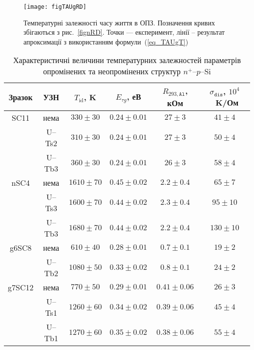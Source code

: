 \begin{figure}
\center
\texttt{[image: figTAUgRD]}%
\caption{\label{figTAUgRD}
Температурні залежності часу життя в ОПЗ.
Позначення кривих збігаються з рис.~\ref{fignRD}.
Точки --- експеримент,
лінії -- результат апроксимації з використанням формули~(\ref{eq_TAUgT})
}%
\end{figure}


\begin{table}[b]
\caption{\label{tabSSCparRD}Характеристичні величини температурних залежностей параметрів опромінених та неопромінених
структур $n^+$--$p$--Si
}
\centering
\begin{tabular}{|c|c|c|c|c|c|} \hline
Зразок&УЗН&$T_{\mathrm{id}}$, K&$E_{\tau g}$, еВ&$R_{293,\mathtt{Al}}$, кОм&$\sigma_{\mathtt{dis}}$, $10^4$~K/Ом\\
\hline
SC11&нема&$330\pm30$&$0.24\pm0.01$&$27\pm3$&$41\pm4$\\ \hline
&U--Ts2&$310\pm30$&$0.24\pm0.01$&$27\pm3$&$50\pm4$\\ \hline
&U--Tb3&$360\pm30$&$0.24\pm0.01$&$26\pm3$&$58\pm4$\\ \hline
nSC4&нема&$1610\pm70$&$0.45\pm0.02$&$2.2\pm0.4$&$65\pm7$\\ \hline
&U--Ts3&$1600\pm70$&$0.44\pm0.02$&$2.3\pm0.4$&$95\pm10$\\ \hline
&U--Tb3&$1680\pm70$&$0.44\pm0.02$&$2.2\pm0.4$&$130\pm10$\\ \hline
g6SC8&нема&$610\pm40$&$0.28\pm0.01$&$0.7\pm0.1$&$19\pm2$\\ \hline
&U--Tb2&$1080\pm50$&$0.33\pm0.02$&$0.8\pm0.1$&$24\pm2$\\ \hline
g7SC12&нема&$770\pm50$&$0.29\pm0.01$&$0.41\pm0.06$&$26\pm3$\\ \hline
&U--Ts1&$1260\pm60$&$0.34\pm0.02$&$0.39\pm0.06$&$45\pm4$\\ \hline
&U--Tb1&$1270\pm60$&$0.35\pm0.02$&$0.38\pm0.06$&$55\pm4$\\ \hline
\end{tabular}
\end{table}

